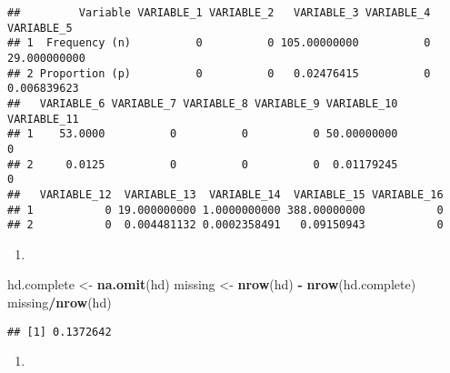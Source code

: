 \documentclass[
]{article}
\newenvironment{Shaded}{\begin{snugshade}}{\end{snugshade}}
\newcommand{\KeywordTok}[1]{\textcolor[rgb]{0.13,0.29,0.53}{\textbf{#1}}}
\newcommand{\NormalTok}[1]{#1}
\newcommand{\OperatorTok}[1]{\textcolor[rgb]{0.81,0.36,0.00}{\textbf{#1}}}
\newcommand{\StringTok}[1]{\textcolor[rgb]{0.31,0.60,0.02}{#1}}
\begin{document}
\begin{verbatim}
##         Variable VARIABLE_1 VARIABLE_2   VARIABLE_3 VARIABLE_4   VARIABLE_5
## 1  Frequency (n)          0          0 105.00000000          0 29.000000000
## 2 Proportion (p)          0          0   0.02476415          0  0.006839623
##   VARIABLE_6 VARIABLE_7 VARIABLE_8 VARIABLE_9 VARIABLE_10 VARIABLE_11
## 1    53.0000          0          0          0 50.00000000           0
## 2     0.0125          0          0          0  0.01179245           0
##   VARIABLE_12  VARIABLE_13  VARIABLE_14  VARIABLE_15 VARIABLE_16
## 1           0 19.000000000 1.0000000000 388.00000000           0
## 2           0  0.004481132 0.0002358491   0.09150943           0
\end{verbatim}

\begin{enumerate}
\def\labelenumi{\alph{enumi})}
\setcounter{enumi}{1}
\item
\end{enumerate}

\begin{Shaded}
\begin{Highlighting}[]
\NormalTok{hd.complete <-}\StringTok{ }\KeywordTok{na.omit}\NormalTok{(hd)}
\NormalTok{missing <-}\StringTok{ }\KeywordTok{nrow}\NormalTok{(hd) }\OperatorTok{-}\StringTok{ }\KeywordTok{nrow}\NormalTok{(hd.complete)}
\NormalTok{missing}\OperatorTok{/}\KeywordTok{nrow}\NormalTok{(hd)}
\end{Highlighting}
\end{Shaded}

\begin{verbatim}
## [1] 0.1372642
\end{verbatim}

\begin{enumerate}
\def\labelenumi{\alph{enumi})}
\setcounter{enumi}{2}
\item
\end{enumerate}
\end{document}
